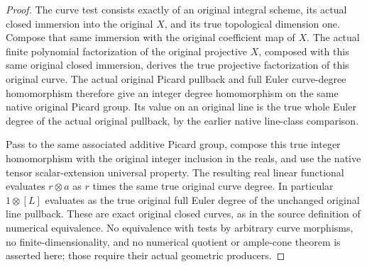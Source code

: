 \begin{proof}
The curve test consists exactly of an original integral scheme,
its actual closed immersion into the original $X$, and its true
topological dimension one. Compose that same immersion with the
original coefficient map of $X$. The actual finite polynomial
factorization of the original projective $X$, composed with
this same original closed immersion, derives the true projective
factorization of this original curve. The actual original
Picard pullback and full Euler curve-degree homomorphism therefore
give an integer degree homomorphism on the same native original
Picard group. Its value on an original line is the true whole
Euler degree of the actual original pullback, by the earlier
native line-class comparison.

Pass to the same associated additive Picard group, compose this
true integer homomorphism with the original integer inclusion in
the reals, and use the native tensor scalar-extension universal
property. The resulting real linear functional evaluates
$r\otimes a$ as $r$ times the same true original curve degree.
In particular $1\otimes[L]$ evaluates as the true original full
Euler degree of the unchanged original line pullback. These are
exact original closed curves, as in the source definition of
numerical equivalence. No equivalence with tests by arbitrary
curve morphisms, no finite-dimensionality, and no numerical
quotient or ample-cone theorem is asserted here; those require
their actual geometric producers.
\end{proof}
